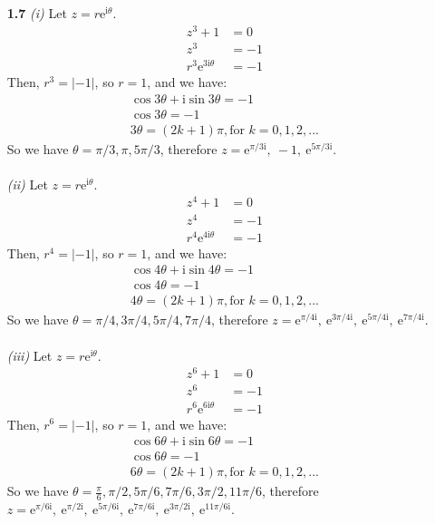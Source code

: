 \begin{enumerate}

\item[\textbf{1.7}] 
\textit{(i)}
Let $z = r\mathrm{e}^{\mathrm{i}\theta}$.
\begin{align*}
    z^3+1 &= 0 \\
    z^3   &= -1 \\
    r^3\mathrm{e}^{3\mathrm{i}\theta} &= -1
\end{align*}
Then, $r^3 = |-1|$, so $ r=1$, and we have:
\begin{gather*}
  \cos 3\theta + \mathrm{i} \sin 3\theta = -1 \\
  \cos 3\theta = -1 \\
  3\theta = (2k+1)\pi, \text{for } k = 0, 1, 2, ...
\end{gather*}
So we have $\theta = \pi/3, \pi, 5\pi/3$, therefore 
$z = \mathrm{e}^{\pi/3\mathrm{i}}, \:
-1, \:
\mathrm{e}^{5\pi/3\mathrm{i}}$.
\\\\
\textit{(ii)}
Let $z = r\mathrm{e}^{\mathrm{i}\theta}$.
\begin{align*}
    z^4+1 &= 0 \\
    z^4   &= -1 \\
    r^4\mathrm{e}^{4\mathrm{i}\theta} &= -1
\end{align*}
Then, $r^4 = |-1|$, so $ r=1$, and we have:
\begin{gather*}
  \cos 4\theta + \mathrm{i} \sin 4\theta = -1 \\
  \cos 4\theta = -1 \\
  4\theta = (2k+1)\pi, \text{for } k = 0, 1, 2, ...
\end{gather*}
So we have $\theta = \pi/4, 3\pi/4, 5\pi/4, 7\pi/4$, 
therefore $z = \mathrm{e}^{\pi/4\mathrm{i}}, \:
\mathrm{e}^{3\pi/4\mathrm{i}}, \:
\mathrm{e}^{5\pi/4\mathrm{i}}, \:
\mathrm{e}^{7\pi/4\mathrm{i}}$.
\\\\
\textit{(iii)}
Let $z = r\mathrm{e}^{\mathrm{i}\theta}$.
\begin{align*}
    z^6+1 &= 0 \\
    z^6   &= -1 \\
    r^6\mathrm{e}^{6\mathrm{i}\theta} &= -1
\end{align*}
Then, $r^6 = |-1|$, so $ r=1$, and we have:
\begin{gather*}
  \cos 6\theta + \mathrm{i} \sin 6\theta = -1 \\
  \cos 6\theta = -1 \\
  6\theta = (2k+1)\pi, \text{for } k = 0, 1, 2, ...
\end{gather*}
So we have 
$\theta = \frac{\pi}{6}, \pi/2, 5\pi/6, 7\pi/6, 3\pi/2, 11\pi/6$, 
therefore 
$z = \mathrm{e}^{\pi/6\mathrm{i}}, \:
\mathrm{e}^{\pi/2\mathrm{i}},\:
\mathrm{e}^{5\pi/6\mathrm{i}},\:
\mathrm{e}^{7\pi/6\mathrm{i}},\:
\mathrm{e}^{3\pi/2\mathrm{i}},\:
\mathrm{e}^{11\pi/6\mathrm{i}}
$.


\end{enumerate}
